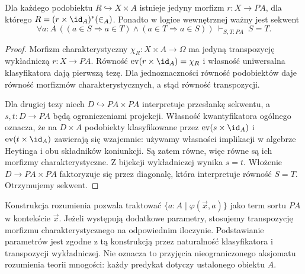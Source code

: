 \begin{twierdzenie}\label{cat:thm:cl-comprehension}
Dla każdego podobiektu $R\hookrightarrow X\times A$ istnieje jedyny morfizm $r:X\to PA$, dla którego $R=(r\times\id_A)^*(\in_A)$. Ponadto w logice wewnętrznej ważny jest sekwent
\[
 \forall a:A\,((a\in S\Rightarrow a\in T)\wedge
                 (a\in T\Rightarrow a\in S))
 \ \vdash_{S,T:PA}\ S=T.
\]
\end{twierdzenie}
\begin{proof}
Morfizm charakterystyczny $\chi_R:X\times A\to\Omega$ ma jedyną transpozycję wykładniczą $r:X\to PA$. Równość $\operatorname{ev}(r\times\id_A)=\chi_R$ i własność uniwersalna klasyfikatora dają pierwszą tezę. Dla jednoznaczności równość podobiektów daje równość morfizmów charakterystycznych, a stąd równość transpozycji.

Dla drugiej tezy niech $D\hookrightarrow PA\times PA$ interpretuje przesłankę sekwentu, a $s,t:D\to PA$ będą ograniczeniami projekcji. Własność kwantyfikatora ogólnego oznacza, że na $D\times A$ podobiekty klasyfikowane przez $\operatorname{ev}(s\times\id_A)$ i $\operatorname{ev}(t\times\id_A)$ zawierają się wzajemnie: używamy własności implikacji w algebrze Heytinga i obu składników koniunkcji. Są zatem równe, więc równe są ich morfizmy charakterystyczne. Z bijekcji wykładniczej wynika $s=t$. Włożenie $D\to PA\times PA$ faktoryzuje się przez diagonalę, która interpretuje równość $S=T$. Otrzymujemy sekwent.
\end{proof}

Konstrukcja rozumienia pozwala traktować $\{a:A\mid\varphi(\vec x,a)\}$ jako term sortu $PA$ w kontekście $\vec x$. Jeżeli występują dodatkowe parametry, stosujemy transpozycję morfizmu charakterystycznego na odpowiednim iloczynie. Podstawianie parametrów jest zgodne z tą konstrukcją przez naturalność klasyfikatora i transpozycji wykładniczej. Nie oznacza to przyjęcia nieograniczonego aksjomatu rozumienia teorii mnogości: każdy predykat dotyczy ustalonego obiektu $A$.

